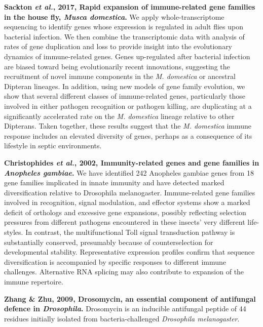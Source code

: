 \documentclass[11pt]{article}
\begin{document}
\begin{sloppypar}
\textbf{Sackton \textit{et al.}, 2017, Rapid expansion of immune-related gene families in the house fly, \textit{Musca domestica}.} \newline
We apply whole-transcriptome sequencing to identify genes whose expression is regulated in adult flies upon bacterial infection. 
We then combine the transcriptomic data with analysis of rates of gene duplication and loss to provide insight into the evolutionary dynamics of immune-related genes. 
Genes up-regulated after bacterial infection are biased toward being evolutionarily recent innovations, suggesting the recruitment of novel immune components in the \textit{M. domestica} or ancestral Dipteran lineages. 
In addition, using new models of gene family evolution, we show that several different classes of immune-related genes, particularly those involved in either pathogen recognition or pathogen killing, are duplicating at a significantly accelerated rate on the \textit{M. domestica} lineage relative to other Dipterans. 
Taken together, these results suggest that the \textit{M. domestica} immune response includes an elevated diversity of genes, perhaps as a consequence of its lifestyle in septic environments.
\par
\textbf{Christophides \textit{et al.}, 2002, Immunity-related genes and gene families in \textit{Anopheles gambiae}.} \newline
We have identified 242 Anopheles gambiae genes from 18 gene families implicated in innate immunity and have detected marked diversification relative to Drosophila melanogaster. Immune-related gene families involved in recognition, signal modulation, and effector systems show a marked deficit of orthologs and excessive gene expansions, possibly reflecting selection pressures from different pathogens encountered in these insects' very different life-styles. In contrast, the multifunctional Toll signal transduction pathway is substantially conserved, presumably because of counterselection for developmental stability. Representative expression profiles confirm that sequence diversification is accompanied by specific responses to different immune challenges. Alternative RNA splicing may also contribute to expansion of the immune repertoire.
\par
\textbf{Zhang & Zhu, 2009, Drosomycin, an essential component of antifungal defence in \textit{Drosophila}.} \newline
Drosomycin is an inducible antifungal peptide of 44 residues initially isolated from bacteria-challenged \textit{Drosophila melanogaster}. 

\end{sloppypar}
\end{document}
